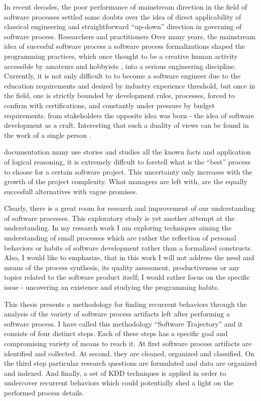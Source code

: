 In recent decades, the poor performance of mainstream direction in the field of software processes
settled some doubts over the idea of direct applicability of classical engineering and
straightforward ``up-down'' direction in governing of software process. Researchers and practitioners
Over many years, the mainstream idea of succesful software process 
a software process formalizations shaped the programming practices, 
which once thought to be a creative human activity accessible by amateurs 
and hobbyists \cite{citeulike:9958822}, into a serious engineering discipline. 
Currently, it is not only difficult to to become a software engineer due to the education 
requirements and desired by industry experience threshold, but once in the field, one is 
strictly bounded by development rules, processes, forced to confirm with certifications, 
and constantly under pressure by budget requirements. 
 from stakeholders the opposite idea was born - the idea of 
software development as a craft. Interesting that such a duality of views can be found 
in the work of a single person \cite{citeulike:5203446}.



 documentation many 
use stories and studies all the known facts and application of logical 
reasoning, it is extremely diffcult to foretell what is the ``best'' process to choose for a 
certain software project. This uncertainty only increases with the growth of the project complexity.
What managers are left with, are the equally succesfull alternatives with vague promises. 

Clearly, there is a great room for research and improvement of our understanding of software processes.
This exploratory study is yet another attempt at the understanding. In my research work I am 
exploring techniques aiming the understanding of small processes which are 
rather the reflection of personal behaviors or habits of software development rather than a 
formalized constructs. Also, I would like to emphasize, that in this work I will not 
address the need and means of the process synthesis, its quality assessment, productiveness
or any topics related to the software product itself; I would rather focus on the specific issue - 
uncovering an existence and studying the programming habits. 

This thesis presents a methodology for finding recurrent behaviors through the 
analysis of the variety of software process artifacts left after performing a 
software process. I have called this methodology ``Software Trajectory'' and it consists 
of four distinct steps. Each of these steps has a specific goal and compromising variety of 
means to reach it. 
At first software process artifacts are identified and collected. 
At second, they are cleaned, organized and classified. 
On the third step particular research questions are formulated and data are organized and indexed. 
And finally, a set of KDD techniques is applied in order to undercover recurrent behaviors which 
could potentially shed a light on the performed process details. 

